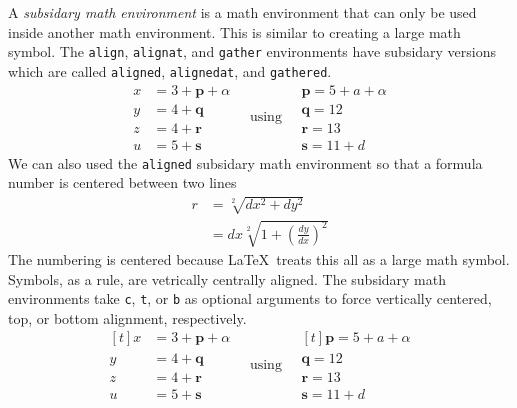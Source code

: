 \documentclass[12pt]{amsart}
\begin{document}
A \emph{subsidary math environment} is a math environment that can only be used inside another math environment. This is similar to creating a large math symbol. The \texttt{align}, \texttt{alignat}, and \texttt{gather} environments have subsidary versions which are called \texttt{aligned}, \texttt{alignedat}, and \texttt{gathered}. 
\[
   \begin{aligned}
      x &= 3 + \mathbf{p} + \alpha \\
      y &= 4 + \mathbf{q} \\
      z &= 4 + \mathbf{r} \\
      u &= 5 + \mathbf{s}
   \end{aligned}
   \quad\text{using}\quad
   \begin{gathered}
      \mathbf{p} = 5 + a + \alpha \\
      \mathbf{q} = 12 \\
      \mathbf{r} = 13 \\
      \mathbf{s} = 11 + d
   \end{gathered}
\]
We can also used the \texttt{aligned} subsidary math environment so that a formula number is centered between two lines
\begin{equation}
   \begin{aligned}
   r &=  \sqrt[2]{dx^2 + dy^2} \\
     &=  dx \sqrt[2]{1 + \left(\frac{dy}{dx}\right)^2}
   \end{aligned}
\end{equation}
The numbering is centered because \LaTeX \ treats this all as a large math symbol. Symbols, as a rule, are vetrically centrally aligned. The subsidary math environments take \verb+c+, \verb+t+, or \verb+b+ as optional arguments to force vertically centered, top, or bottom alignment, respectively.
\[
   \begin{aligned}[t]
      x &= 3 + \mathbf{p} + \alpha \\
      y &= 4 + \mathbf{q} \\
      z &= 4 + \mathbf{r} \\
      u &= 5 + \mathbf{s}
   \end{aligned}
   \quad\text{using}\quad
   \begin{gathered}[t]
      \mathbf{p} = 5 + a + \alpha \\
      \mathbf{q} = 12 \\
      \mathbf{r} = 13 \\
      \mathbf{s} = 11 + d
   \end{gathered}
\]
\vspace{15 pt}
\end{document}
